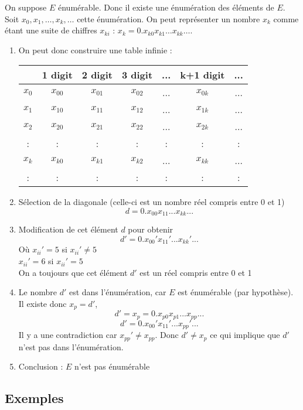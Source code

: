 On suppose $E$ énumérable. Donc il existe une énumération des éléments de $E$.  Soit 
$x_0, x_1,\dots,x_k,\dots$ cette énumération. On peut représenter un nombre $x_k$ comme étant une
suite de chiffres $x_{ki}$ : $x_k = 0.x_{k0}x_{k1}\dots x_{kk}\dots$.

\begin{enumerate}
	\item On peut donc construire une table infinie : \\
		\begin{tabular}{|c||c|c|c|c|c|c|}
			\hline
			& 1 digit & 2 digit & 3 digit & ... & k+1 digit & ... \\
			\hline
			$x_0$ & $x_{00}$ & $x_{01}$ & $x_{02}$ & ... & $x_{0k}$ & ... \\
			$x_1$ & $x_{10}$ & $x_{11}$ & $x_{12}$ & ... & $x_{1k}$ & ... \\
			$x_2$ & $x_{20}$ & $x_{21}$ & $x_{22}$ & ... & $x_{2k}$ & ... \\
			: & : &:& : & : & : &:\\
			$x_k$ & $x_{k0}$ & $x_{k1}$ & $x_{k2}$ & ... & $x_{kk}$ & ... \\
			: & : &:& : & : & : &:\\
			\hline
		\end{tabular}
	\item Sélection de la diagonale (celle-ci est un nombre réel compris
		entre 0 et 1)
		\[ d=0.x_{00}x_{11}...x_{kk}... \]
	\item Modification de cet élément $d$ pour obtenir
		\[ d'=0.x_{00}'x_{11}'...x_{kk}'... \]
		Où $x_{ii}'=5$ si $x_{ii}'\neq 5$ \\
		$x_{ii}'=6$ si $x_{ii}'= 5$ \\
		On a toujours que cet élément $d'$ est un réel compris entre 0 et 1
	\item Le nombre $d'$ est dans l'énumération, car $E$ est
		énumérable (par hypothèse). Il existe donc $x_p=d'$,
		\[ d'=x_p=0.x_{p0}x_{p1}...x_{pp}... \]
		\[ d'=0.x_{00}'x_{11}'...x_{pp}'... \]
		Il y a une contradiction car $x_{pp}' \neq
	       	x_{pp}$. Donc $d' \neq x_p$ ce qui implique que $d'$ n'est pas
		dans l'énumération.
	\item Conclusion : $E$ n'est pas énumérable

\end{enumerate}

\subsection{Exemples}
\label{subsec:exemples_non_enum}

